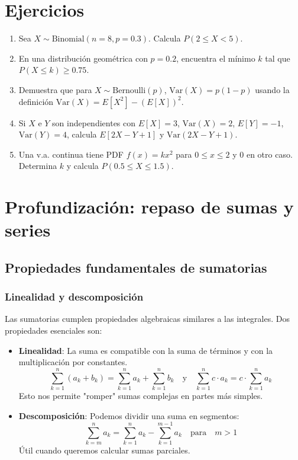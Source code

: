 \documentclass[letterpaper, 12pt]{article}
\begin{document}
	\section{Ejercicios}
	
	\begin{enumerate}
		\item Sea $X \sim \text{Binomial}(n=8, p=0.3)$. Calcula $P(2 \leq X < 5)$.
		
		\item En una distribución geométrica con $p=0.2$, encuentra el mínimo $k$ tal que $P(X \leq k) \geq 0.75$.
		
		\item Demuestra que para $X \sim \text{Bernoulli}(p)$, $\text{Var}(X) = p(1-p)$ usando la definición $\text{Var}(X) = E[X^2] - (E[X])^2$.
		
		\item Si $X$ e $Y$ son independientes con $E[X] = 3$, $\text{Var}(X) = 2$, $E[Y] = -1$, $\text{Var}(Y) = 4$, calcula $E[2X - Y + 1]$ y $\text{Var}(2X - Y + 1)$.
		
		\item Una v.a. continua tiene PDF $f(x) = kx^2$ para $0 \leq x \leq 2$ y 0 en otro caso. Determina $k$ y calcula $P(0.5 \leq X \leq 1.5)$.
	\end{enumerate}
	
	\section{Profundización: repaso de sumas y series}
	
	\subsection{Propiedades fundamentales de sumatorias}
	
	\subsubsection{Linealidad y descomposición}
	
	Las sumatorias cumplen propiedades algebraicas similares a las integrales. Dos propiedades esenciales son:
	
	\begin{itemize}
		\item \textbf{Linealidad}: La suma es compatible con la suma de términos y con la multiplicación por constantes.
		\[
		\sum_{k=1}^n (a_k + b_k) = \sum_{k=1}^n a_k + \sum_{k=1}^n b_k \quad \text{y} \quad \sum_{k=1}^n c \cdot a_k = c \cdot \sum_{k=1}^n a_k
		\]
		Esto nos permite "romper" sumas complejas en partes más simples.
		
		\item \textbf{Descomposición}: Podemos dividir una suma en segmentos:
		\[
		\sum_{k=m}^n a_k = \sum_{k=1}^n a_k - \sum_{k=1}^{m-1} a_k \quad \text{para} \quad m > 1
		\]
		Útil cuando queremos calcular sumas parciales.
	\end{itemize}
	
\end{document}
